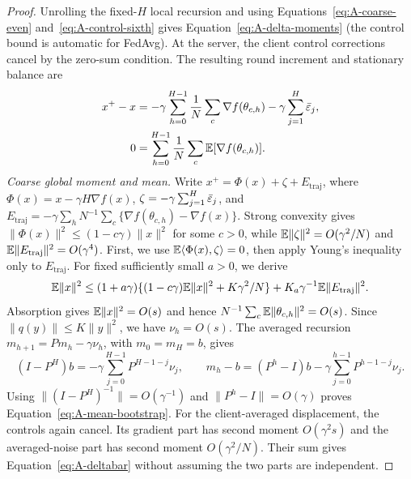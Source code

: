 \begin{proof}
Unrolling the fixed-$H$ local recursion and using Equations~\eqref{eq:A-coarse-even}
and~\eqref{eq:A-control-sixth} gives Equation~\eqref{eq:A-delta-moments}
(the control bound is automatic for FedAvg).
At the server, the client control corrections cancel by the zero-sum
condition. The resulting round increment and stationary balance are
\begin{align}
 x^+-x&=-\gamma\sum_{h=0}^{H-1}\frac1N\sum_c\nabla f(\theta_{c,h})
         -\gamma\sum_{j=1}^H\bar{\varepsilon}_j,
 \label{eq:A-global-increment}\\
 0&=\sum_{h=0}^{H-1}\frac1N\sum_c\mathbb{E}[\nabla f(\theta_{c,h})].
 \label{eq:A-balance}
\end{align}
\emph{Coarse global moment and mean.}
Write $x^+=\Phi(x)+\zeta+E_{\mathrm{traj}}$, where
$\Phi(x)=x-\gamma H\nabla f(x)$, $\zeta=-\gamma\sum_{j=1}^H\bar{\varepsilon}_j$,
and $E_{\mathrm{traj}}=-\gamma\sum_hN^{-1}\sum_c
\{\nabla f(\theta_{c,h})-\nabla f(x)\}$.
Strong convexity gives $\|\Phi(x)\|^2\le(1-c\gamma)\|x\|^2$ for some $c>0$,
while $\mathbb{E}\|\zeta\|^2=O(\gamma^2/N)$ and
$\mathbb{E}\|E_{\mathrm{traj}}\|^2=O(\gamma^4)$.
First, we use $\mathbb{E}\langle\Phi(x),\zeta\rangle=0$, then apply Young's inequality
only to $E_{\mathrm{traj}}$. For fixed sufficiently small $a>0$, we derive
\[
 \mathbb{E}\|x\|^2\le(1+a\gamma)
 \{(1-c\gamma)\mathbb{E}\|x\|^2+K\gamma^2/N\}
 +K_a\gamma^{-1}\mathbb{E}\|E_{\mathrm{traj}}\|^2.
\]
Absorption gives $\mathbb{E}\|x\|^2=O(s)$ and hence
$N^{-1}\sum_c\mathbb{E}\|\theta_{c,h}\|^2=O(s)$.
Since $\|q(y)\|\le K\|y\|^2$, we have $\nu_h=O(s)$.
The averaged recursion $m_{h+1}=Pm_h-\gamma\nu_h$, with $m_0=m_H=b$, gives
\[
 (I-P^H)b=-\gamma\sum_{j=0}^{H-1}P^{H-1-j}\nu_j,\qquad
 m_h-b=(P^h-I)b-\gamma\sum_{j=0}^{h-1}P^{h-1-j}\nu_j.
\]
Using $\|(I-P^H)^{-1}\|=O(\gamma^{-1})$ and $\|P^h-I\|=O(\gamma)$
proves Equation~\eqref{eq:A-mean-bootstrap}. For the client-averaged displacement, the controls again cancel. Its
gradient part has second moment
$O(\gamma^2s)$ and the averaged-noise part has second moment $O(\gamma^2/N)$.
Their sum gives Equation~\eqref{eq:A-deltabar} without assuming the two parts
are independent.


\end{proof}
